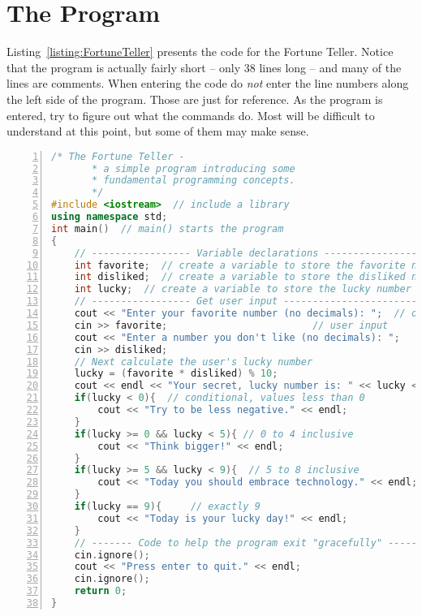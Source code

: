 \section{The Program}

Listing~\ref{listing:FortuneTeller} presents the code for the Fortune Teller.  Notice that the program is actually fairly short -- only 38 lines long -- and many of the lines are comments.  When entering the code do \emph{not} enter the line numbers along the left side of the program.  Those are just for reference.  As the program is entered, try to figure out what the commands do.  Most will be difficult to understand at this point, but some of them may make sense.

\begin{minipage}{\textwidth}
\begin{lstlisting}[language=C++,numbers = left, xleftmargin=4.0ex, basicstyle=\small,emph={num_objects,move,current_player},emphstyle = \color{\mycolor},
showstringspaces=false,
caption = {The code for the Fortune Teller.  When entering this program, do not enter the line numbers.  Keywords (also known as reserved words) are in bold, comments are in italics, and variables are colored maroon.}]
      /* The Fortune Teller -
       * a simple program introducing some
       * fundamental programming concepts.
       */
#include <iostream>  // include a library
using namespace std;
int main()  // main() starts the program
{
	// ----------------- Variable declarations ------------------------
	int favorite;  // create a variable to store the favorite number
	int disliked;  // create a variable to store the disliked number
	int lucky;  // create a variable to store the lucky number
	// ----------------- Get user input -----------------------------
	cout << "Enter your favorite number (no decimals): ";  // output
	cin >> favorite;                         // user input
	cout << "Enter a number you don't like (no decimals): ";
	cin >> disliked;
	// Next calculate the user's lucky number
	lucky = (favorite * disliked) % 10;
	cout << endl << "Your secret, lucky number is: " << lucky << endl;
	if(lucky < 0){  // conditional, values less than 0
		cout << "Try to be less negative." << endl;
	}
	if(lucky >= 0 && lucky < 5){ // 0 to 4 inclusive
		cout << "Think bigger!" << endl;
	}
	if(lucky >= 5 && lucky < 9){  // 5 to 8 inclusive
		cout << "Today you should embrace technology." << endl;
	}
	if(lucky == 9){     // exactly 9
		cout << "Today is your lucky day!" << endl;
	}
	// ------- Code to help the program exit "gracefully" --------
	cin.ignore();
	cout << "Press enter to quit." << endl;
	cin.ignore();
	return 0;
}
\end{lstlisting}\label{listing:FortuneTeller}
\end{minipage}



